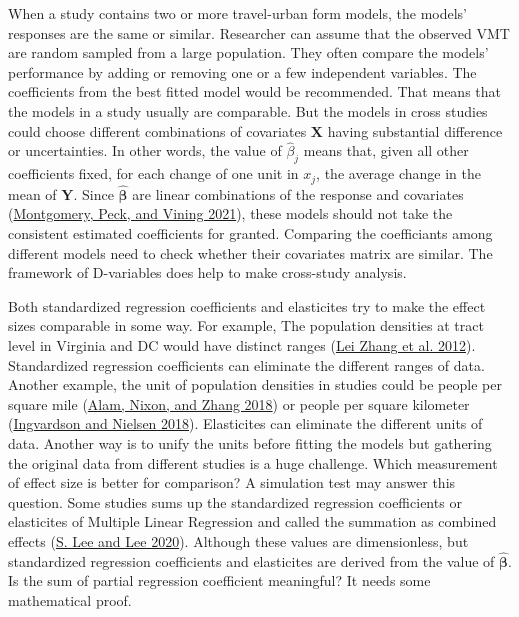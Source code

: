 \documentclass[
  11pt,
  openany]{memoir}
\begin{document}
When a study contains two or more travel-urban form models, the models' responses are the same or similar. Researcher can assume that the observed VMT are random sampled from a large population. They often compare the models' performance by adding or removing one or a few independent variables. The coefficients from the best fitted model would be recommended. That means that the models in a study usually are comparable.
But the models in cross studies could choose different combinations of covariates \(\mathbf{X}\) having substantial difference or uncertainties.
In other words, the value of \(\hat \beta_j\) means that, given all other coefficients fixed, for each change of one unit in \(x_j\), the average change in the mean of \(\mathbf{Y}\).
Since \(\boldsymbol{\hat\beta}\) are linear combinations of the response and covariates (\protect\hyperlink{ref-montgomeryIntroductionLinearRegression2021}{Montgomery, Peck, and Vining 2021}),
these models should not take the consistent estimated coefficients for granted.
Comparing the coefficiants among different models need to check whether their covariates matrix are similar. The framework of D-variables does help to make cross-study analysis.

Both standardized regression coefficients and elasticites try to make the effect sizes comparable in some way.
For example, The population densities at tract level in Virginia and DC would have distinct ranges (\protect\hyperlink{ref-zhangHowBuiltEnvironment2012}{Lei Zhang et al. 2012}). Standardized regression coefficients can eliminate the different ranges of data.
Another example, the unit of population densities in studies could be people per square mile (\protect\hyperlink{ref-alamFactorsAffectingTravel2018}{Alam, Nixon, and Zhang 2018}) or people per square kilometer (\protect\hyperlink{ref-ingvardsonHowUrbanDensity2018}{Ingvardson and Nielsen 2018}). Elasticites can eliminate the different units of data.
Another way is to unify the units before fitting the models but gathering the original data from different studies is a huge challenge.
Which measurement of effect size is better for comparison? A simulation test may answer this question.
Some studies sums up the standardized regression coefficients or elasticites of Multiple Linear Regression and called the summation as combined effects (\protect\hyperlink{ref-leeComparingImpactsLocal2020}{S. Lee and Lee 2020}).
Although these values are dimensionless, but standardized regression coefficients and elasticites are derived from the value of \(\boldsymbol{\hat\beta}\). Is the sum of partial regression coefficient meaningful? It needs some mathematical proof.
\end{document}
